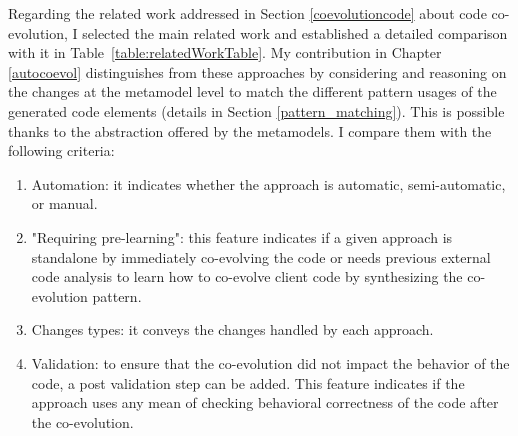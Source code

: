   Regarding the related work addressed in Section \ref{coevolutioncode} about code co-evolution, I selected the main related work and established a detailed comparison with it in Table~\ref{table:relatedWorkTable}. My contribution in Chapter \ref{autocoevol} distinguishes from these approaches by considering and reasoning on the changes at the metamodel level to match the different pattern usages of the generated code elements (details in Section \ref{pattern_matching}). This is possible thanks to the abstraction offered by the metamodels. 
  I compare them with the following criteria: %
  
  \begin{enumerate}
  	
  	\item Automation: it indicates whether the approach is automatic, semi-automatic, or manual.
  	\item "Requiring pre-learning": 
  	this feature indicates if a given approach is standalone by immediately co-evolving the code or needs previous external code analysis to learn how to co-evolve client code by synthesizing the co-evolution pattern.
  	\item Changes types: it conveys the changes handled by each approach.
  	\item Validation: to ensure that the co-evolution did not impact the behavior of the code, a post validation step can be added. This feature indicates if the approach uses any mean of checking behavioral correctness of the code after the co-evolution.
  
  \end{enumerate}
  
